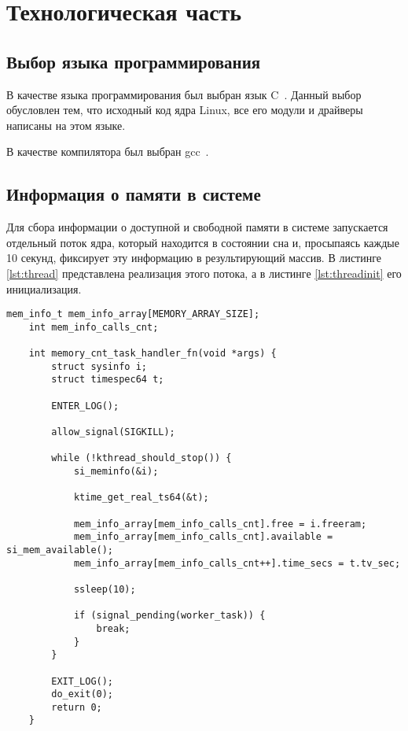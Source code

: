 \section{Технологическая часть}

\subsection{Выбор языка программирования}

В качестве языка программирования был выбран язык C~\cite{c99}. Данный выбор обусловлен тем, что исходный код ядра Linux, все его модули и драйверы написаны на этом языке.

В качестве компилятора был выбран gcc~\cite{gcc}.

\subsection{Информация о памяти в системе}

Для сбора информации о доступной и свободной памяти в системе запускается отдельный поток ядра, который находится в состоянии сна и,
просыпаясь каждые 10 секунд, фиксирует эту информацию в результирующий массив. В листинге \ref{lst:thread} представлена реализация этого потока, а в листинге \ref{lst:threadinit} его инициализация.

\begin{lstlisting}[label={lst:thread}, caption={реализация функции сохраняющей информацию о памяти}]
	mem_info_t mem_info_array[MEMORY_ARRAY_SIZE];
	int mem_info_calls_cnt;
	
	int memory_cnt_task_handler_fn(void *args) {
		struct sysinfo i;
		struct timespec64 t;
		
		ENTER_LOG();
		
		allow_signal(SIGKILL);
		
		while (!kthread_should_stop()) {
			si_meminfo(&i);
			
			ktime_get_real_ts64(&t);
			
			mem_info_array[mem_info_calls_cnt].free = i.freeram;
			mem_info_array[mem_info_calls_cnt].available = si_mem_available();
			mem_info_array[mem_info_calls_cnt++].time_secs = t.tv_sec;
			
			ssleep(10);
			
			if (signal_pending(worker_task)) {
				break;
			}
		}
		
		EXIT_LOG();
		do_exit(0);
		return 0;
	}
\end{lstlisting}

